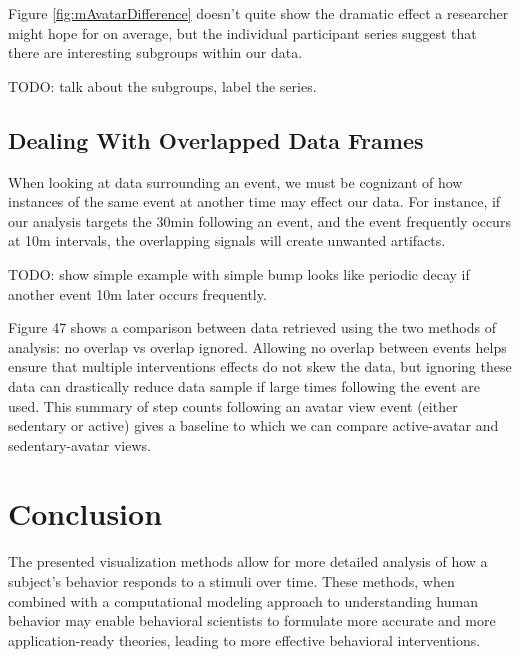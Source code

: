 \documentclass[preprint,journal]{vgtc}       %
\begin{document}
Figure \ref{fig:mAvatarDifference} doesn't quite show the dramatic effect a researcher might hope for on average, but the individual participant series suggest that there are interesting subgroups within our data.

TODO: talk about the subgroups, label the series.

\subsection{Dealing With Overlapped Data Frames}
When looking at data surrounding an event, we must be cognizant of how instances of the same event at another time may effect our data. For instance, if our analysis targets the 30min following an event, and the event frequently occurs at 10m intervals, the overlapping signals will create unwanted artifacts.

TODO: show simple example with simple bump looks like periodic decay if another event 10m later occurs frequently. 

Figure 47 shows a comparison between data retrieved using the two methods of analysis: no overlap vs overlap ignored. 
Allowing no overlap between events helps ensure that multiple interventions effects do not skew the data, but ignoring these data can drastically reduce data sample if large times following the event are used. 
This summary of step counts following an avatar view event (either sedentary or active) gives a baseline to which we can compare active-avatar and sedentary-avatar views.


\section{Conclusion}
The presented visualization methods allow for more detailed analysis of how a subject’s behavior responds to a stimuli over time. 
These methods, when combined with a computational modeling approach to understanding human behavior may enable behavioral scientists to formulate more accurate and more application-ready theories, leading to more effective behavioral interventions. 




\end{document}
